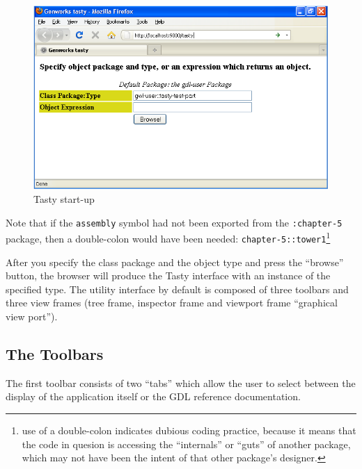 \documentclass [11pt]{book}
\begin{document}
\begin{figure}
\begin{center}
\includegraphics{../images/tasty-start.png}
\end{center}

\caption{Tasty start-up}

\label{fig:tasty-startup}

\end{figure}


Note that if the \texttt{assembly} symbol had not been exported from the \texttt{:chapter-5} package, then a double-colon would have been needed: \texttt{chapter-5::tower1}\footnote{use of a double-colon indicates dubious coding
practice, because it means that the code in quesion is accessing the
``internals'' or ``guts'' of another package, which may not have been
the intent of that other package's designer.}



After you specify the class package and the object type and
press the ``browse'' button, the browser will produce the Tasty
interface with an instance of the specified type. The utility
interface by default is composed of three toolbars and three view
frames (tree frame, inspector frame and viewport frame ``graphical
view port'').



\subsection{The Toolbars}

\label{subsec:thetoolbars}



The first toolbar consists of two ``tabs'' which allow the
user to select between the display of the application itself or the
GDL reference documentation.
\end{document}
